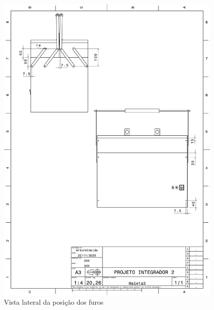 \begin{figure}[H]
    \centering
    \includegraphics[width=.7\textwidth]{Figuras/montagemMaletasEstrutura/PARAFUSOALIMENTAÇÃO1.pdf}
    \caption{Vista lateral da posição dos furos}
    \label{fig:posicaoFuroAlimentacao1}
\end{figure}

